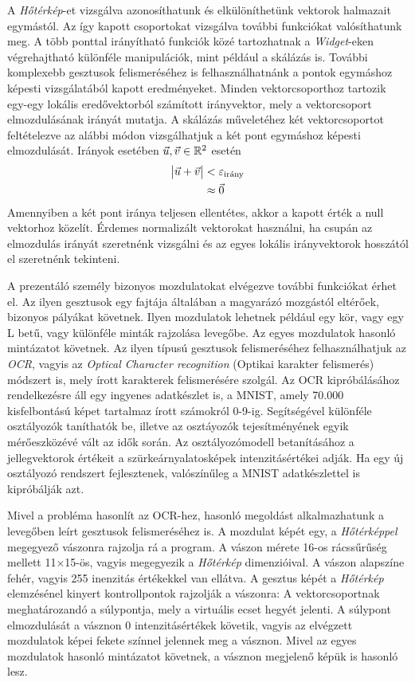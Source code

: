
A \textit{Hőtérkép}-et vizsgálva azonosíthatunk és elkülöníthetünk vektorok halmazait egymástól. Az így kapott csoportokat vizsgálva további funkciókat valósíthatunk meg. A több ponttal irányítható funkciók közé tartozhatnak a \textit{Widget}-eken végrehajtható különféle manipulációk, mint például a skálázás is. További komplexebb gesztusok felismeréséhez is felhasználhatnánk a pontok egymáshoz képesti vizsgálatából kapott eredményeket.
Minden vektorcsoporthoz tartozik egy-egy lokális eredővektorból számított irányvektor, mely a vektorcsoport elmozdulásának irányát mutatja.
A skálázás műveletéhez két vektorcsoportot feltételezve az alábbi módon vizsgálhatjuk a két pont egymáshoz képesti elmozdulását.
Irányok esetében $\vec{u},\vec{v}\in \Bbb R^2$ esetén
\begin{align*}
\vmatrix \vec{u}+\vec{v} \endvmatrix &< \varepsilon_{\text{irány}}\\
&\approx \vec{0}
\end{align*}
Amennyiben a két pont iránya teljesen ellentétes, akkor a kapott érték a null vektorhoz közelít. Érdemes normalizált vektorokat használni, ha csupán az elmozdulás irányát szeretnénk vizsgálni és az egyes lokális irányvektorok hosszától el szeretnénk tekinteni.


A prezentáló személy bizonyos mozdulatokat elvégezve további funkciókat érhet el. Az ilyen gesztusok egy fajtája általában a magyarázó mozgástól eltérőek, bizonyos pályákat követnek. Ilyen mozdulatok lehetnek például egy kör, vagy egy L betű, vagy különféle minták rajzolása levegőbe. Az egyes mozdulatok hasonló mintázatot követnek.
Az ilyen típusú gesztusok felismeréséhez felhasználhatjuk az \textit{OCR}, vagyis az \textit{Optical Character recognition} (Optikai karakter felismerés) módszert is, mely írott karakterek felismerésére szolgál. 
Az OCR kipróbálásához rendelkezésre áll egy ingyenes adatkészlet is, a MNIST, amely 70.000 kisfelbontású képet tartalmaz írott számokról 0-9-ig. Segítségével különféle osztályozók taníthatók be, illetve az osztáyozók tejesítményének egyik mérőeszközévé vált az idők során. Az osztályozómodell betanításához a jellegvektorok értékeit a szürkeárnyalatosképek intenzitásértékei adják. Ha egy új osztályozó rendszert fejlesztenek, valószínűleg a MNIST adatkészlettel is kipróbálják azt. \cite{geron2019hands}

Mivel a probléma hasonlít az OCR-hez, hasonló megoldást alkalmazhatunk a levegőben leírt gesztusok felismeréséhez is. A mozdulat képét egy, a \textit{Hőtérképpel} megegyező vászonra rajzolja rá a program. A vászon mérete 16-os rácssűrűség mellett 11$\times$15-ös, vagyis megegyezik a \textit{Hőtérkép} dimenzióival. A vászon alapszíne fehér, vagyis 255 inenzitás értékekkel van ellátva. A gesztus képét a \textit{Hőtérkép} elemzésénel kinyert kontrollpontok rajzolják a vászonra: A vektorcsoportnak meghatározandó a súlypontja, mely a virtuális ecset hegyét jelenti. A súlypont elmozdulását a vásznon 0 intenzitásértékek követik, vagyis az elvégzett mozdulatok képei fekete színnel jelennek meg a vásznon. Mivel az egyes mozdulatok hasonló mintázatot követnek, a vásznon megjelenő képük is hasonló lesz.

